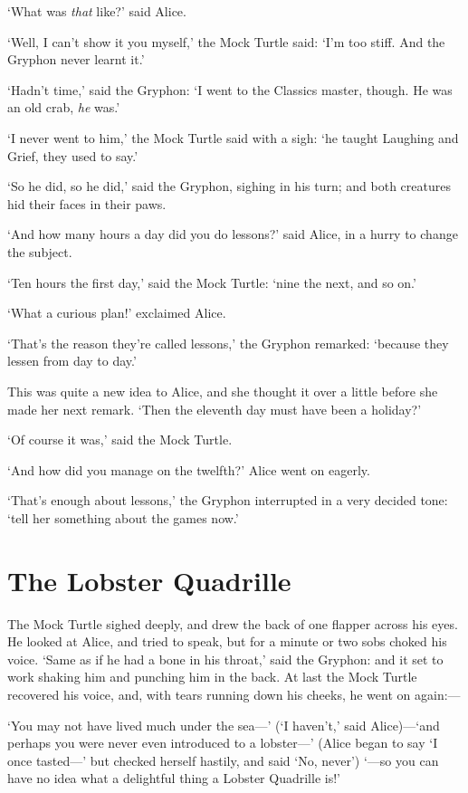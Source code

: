 \documentclass[12pt,openany]{memoir}
\begin{document}
`What was \textit{that} like?' said Alice.

`Well, I can't show it you myself,' the Mock Turtle said: `I'm too stiff. And the Gryphon never learnt it.'

`Hadn't time,' said the Gryphon: `I went to the Classics master, though. He was an old crab, \textit{he} was.'

`I never went to him,' the Mock Turtle said with a sigh: `he taught Laughing and Grief, they used to say.'

`So he did, so he did,' said the Gryphon, sighing in his turn; and both creatures hid their faces in their paws.

`And how many hours a day did you do lessons?' said Alice, in a hurry to change the subject.

`Ten hours the first day,' said the Mock Turtle: `nine the next, and so on.'

`What a curious plan!' exclaimed Alice.

`That's the reason they're called lessons,' the Gryphon re\-marked: `because they lessen from day to day.'

This was quite a new idea to Alice, and she thought it over a little before she made her next remark. `Then the eleventh day must have been a holiday?'

`Of course it was,' said the Mock Turtle.

`And how did you manage on the twelfth?' Alice went on eagerly.

`That's enough about lessons,' the Gryphon interrupted in a very decided tone: `tell her something about the games now.'


\chapter{The Lobster Quadrille}

The Mock Turtle sighed deeply, and drew the back of one flapper across his eyes. He looked at Alice, and tried to speak, but for a minute or two sobs choked his voice. `Same as if he had a bone in his throat,' said the Gryphon: and it set to work shaking him and punching him in the back. At last the Mock Turtle recovered his voice, and, with tears running down his cheeks, he went on again:---

`You may not have lived much under the sea---' (`I haven't,' said Alice)---`and perhaps you were never even introduced to a lobster---' (Alice began to say `I once tasted---' but checked herself hastily, and said `No, never') `---so you can have no idea what a delightful thing a Lobster Quadrille is!'
\end{document}
